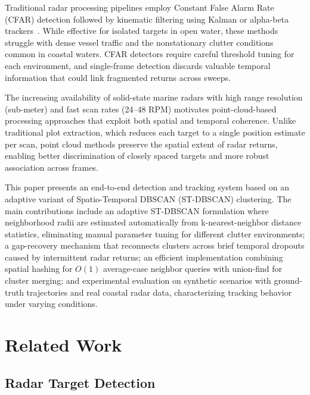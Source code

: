 \documentclass[conf]{new-aiaa}
\begin{document}
Traditional radar processing pipelines employ Constant False Alarm Rate (CFAR) detection followed by kinematic filtering using Kalman or alpha-beta trackers~\cite{rohling1983radar, bar2011tracking}. While effective for isolated targets in open water, these methods struggle with dense vessel traffic and the nonstationary clutter conditions common in coastal waters. CFAR detectors require careful threshold tuning for each environment, and single-frame detection discards valuable temporal information that could link fragmented returns across sweeps.

The increasing availability of solid-state marine radars with high range resolution (sub-meter) and fast scan rates (24--48 RPM) motivates point-cloud-based processing approaches that exploit both spatial and temporal coherence. Unlike traditional plot extraction, which reduces each target to a single position estimate per scan, point cloud methods preserve the spatial extent of radar returns, enabling better discrimination of closely spaced targets and more robust association across frames.

This paper presents an end-to-end detection and tracking system based on an adaptive variant of Spatio-Temporal DBSCAN (ST-DBSCAN) clustering. The main contributions include an adaptive ST-DBSCAN formulation where neighborhood radii are estimated automatically from k-nearest-neighbor distance statistics, eliminating manual parameter tuning for different clutter environments; a gap-recovery mechanism that reconnects clusters across brief temporal dropouts caused by intermittent radar returns; an efficient implementation combining spatial hashing for $O(1)$ average-case neighbor queries with union-find for cluster merging; and experimental evaluation on synthetic scenarios with ground-truth trajectories and real coastal radar data, characterizing tracking behavior under varying conditions.


\section{Related Work}

\subsection{Radar Target Detection}
\end{document}
